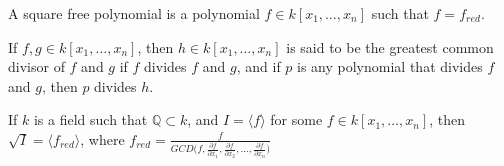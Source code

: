 \documentclass[crop=false,class=book,oneside]{standalone}
\begin{document}
\begin{definition}
A square free polynomial is a polynomial $f\in k[x_1,\hdots ,x_n]$ such that $f = f_{red}$.
\end{definition}
\begin{definition}
If $f,g\in k[x_1,\hdots ,x_n]$, then $h\in k[x_1,\hdots ,x_n]$ is said to be the greatest common divisor of $f$ and $g$ if $f$ divides $f$ and $g$, and if $p$ is any polynomial that divides $f$ and $g$, then $p$ divides $h$.
\end{definition}
\begin{theorem}
If $k$ is a field such that $\mathbb{Q} \subset k$, and $I = \langle f\rangle$ for some $f\in k[x_1,\hdots ,x_n]$, then $\sqrt{I} = \langle f_{red}\rangle$, where $f_{red} = \frac{f}{GCD\big(f, \frac{\partial f}{\partial x_1}, \frac{\partial f}{\partial x_2}, \hdots, \frac{\partial f}{\partial x_n}\big)}$
\end{theorem}
\end{document}
